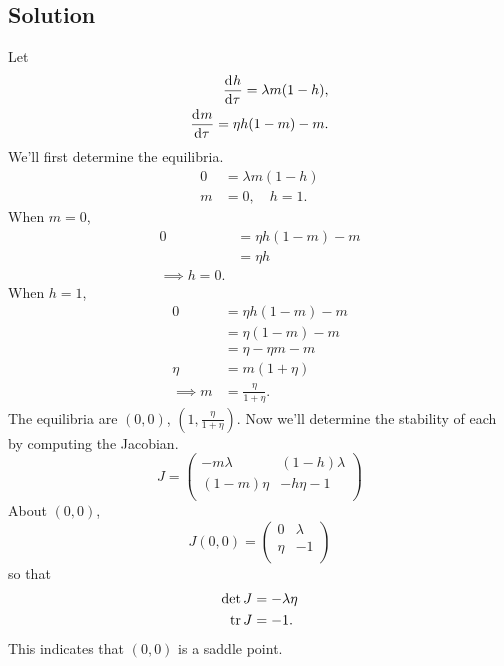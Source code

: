 \documentclass[12pt]{article}
\begin{document}
\subsection*{Solution}
Let
\begin{equation*}
  \begin{aligned}
    \frac{\mathrm{d}^{} {h}}{\mathrm{d}{\tau}^{}} = \lambda m(1-h), \\
    \frac{\mathrm{d}^{} {m}}{\mathrm{d}{\tau}^{}} = \eta h(1-m) - m. \\
  \end{aligned}
\end{equation*}
We'll first determine the equilibria.
\begin{equation*}
  \begin{aligned}
    0 &= \lambda m(1-h) \\
    m&=0,\quad h=1.
  \end{aligned}
\end{equation*}
When $m=0$,
\begin{equation*}
  \begin{aligned}
    0 &= \eta h(1-m)-m \\
    &= \eta h \\
    \implies h=0.
  \end{aligned}
\end{equation*}
When $h=1$,
\begin{equation*}
  \begin{aligned}
    0 &= \eta h(1-m)-m \\
    &= \eta(1-m)-m \\
    &= \eta - \eta m - m \\
    \eta &= m(1+\eta) \\
    \implies m &= \frac{\eta}{1+\eta}.
  \end{aligned}
\end{equation*}
The equilibria are $(0,0)$, $(1,\frac{\eta}{1+\eta})$. Now we'll determine the
stability of each by computing the Jacobian.
\begin{equation*}
  J =
  \begin{pmatrix}
    -m \lambda  & (1-h) \lambda  \\
    (1-m) \eta  & -h \eta -1 \\
  \end{pmatrix}
\end{equation*}
About $(0,0)$,
\begin{equation*}
  J(0,0) =
  \begin{pmatrix}
    0 & \lambda \\
    \eta & -1 \\
  \end{pmatrix}
\end{equation*}
so that
\begin{equation*}
  \begin{aligned}
    \det{J} &= -\lambda\eta \\
    \operatorname{tr}{J} &= -1.
  \end{aligned}
\end{equation*}
This indicates that $(0,0)$ is a saddle point.
\end{document}
